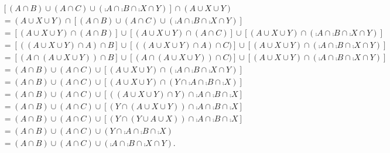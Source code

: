 \documentclass[12pt]{book}
\begin{document}
\begin{enumerate}
\begin{enumerate}
{\begin{align*}&[(A \cap B) \cup (A \cap C) \cup (\comp{A} \cap \comp{B} \cap \comp{X} \cap Y)] \cap (A \cup X \cup Y)\\&= (A \cup X \cup Y) \cap [(A \cap B) \cup (A \cap C) \cup (\comp{A} \cap \comp{B} \cap \comp{X} \cap Y)]\\&=[(A \cup X \cup Y) \cap (A \cap B)] \cup [(A \cup X \cup Y) \cap (A \cap C)] \cup [(A \cup X \cup Y) \cap (\comp{A} \cap \comp{B} \cap \comp{X} \cap Y)]\\&= [((A \cup X \cup Y) \cap A) \cap B] \cup [((A \cup X \cup Y) \cap A)\cap C)] \cup [(A \cup X \cup Y) \cap (\comp{A} \cap \comp{B} \cap \comp{X} \cap Y)]\\&= [(A \cap (A \cup X \cup Y)) \cap B] \cup [(A \cap (A \cup X \cup Y))\cap C)] \cup [(A \cup X \cup Y) \cap (\comp{A} \cap \comp{B} \cap \comp{X} \cap Y)]\\&= (A \cap B) \cup (A \cap C) \cup [(A \cup X \cup Y) \cap (\comp{A} \cap \comp{B} \cap \comp{X} \cap Y)]\\&= (A \cap B) \cup (A \cap C) \cup [(A \cup X \cup Y) \cap (Y \cap \comp{A} \cap \comp{B} \cap \comp{X})]\\&= (A \cap B) \cup (A \cap C) \cup [((A \cup X \cup Y) \cap Y) \cap \comp{A} \cap \comp{B} \cap \comp{X}]\\&= (A \cap B) \cup (A \cap C) \cup [(Y \cap (A \cup X \cup Y)) \cap \comp{A} \cap \comp{B} \cap \comp{X}]\\&= (A \cap B) \cup (A \cap C) \cup [(Y \cap (Y \cup A \cup X)) \cap \comp{A} \cap \comp{B} \cap \comp{X}]\\&= (A \cap B) \cup (A \cap C) \cup (Y \cap \comp{A} \cap \comp{B} \cap \comp{X})\\&= (A \cap B) \cup (A \cap C) \cup (\comp{A} \cap \comp{B} \cap \comp{X} \cap Y).\end{align*}
}
\end{enumerate}
\end{enumerate}
\end{document}
